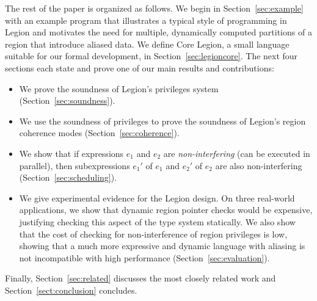 The rest of the paper is organized as follows.
We begin in Section~\ref{sec:example} with an example program that illustrates
a typical style of programming in Legion and motivates the need for multiple, dynamically computed partitions of
a region that introduce aliased data.  We define Core Legion, a small language suitable 
for our formal development, in Section~\ref{sec:legioncore}.
The next four sections each state and prove one of our main results and contributions:
\begin{itemize}
\item We prove the soundness of Legion's privileges system (Section~\ref{sec:soundness}).

\item We use the soundness of privileges to prove the soundness of Legion's region coherence modes (Section~\ref{sec:coherence}).

\item We show that if expressions $e_1$ and $e_2$ are {\em non-interfering} (can be executed in parallel), then subexpressions
$e_1'$ of $e_1$ and $e_2'$ of $e_2$ are also non-interfering (Section~\ref{sec:scheduling}).  

\item We give experimental evidence for the Legion design.  On three real-world applications, we show that 
dynamic region pointer checks would be expensive, justifying checking this aspect of the type system statically.
We also show that the cost of checking for non-interference of region privileges is low, showing that a much more expressive
and dynamic language with aliasing is not incompatible with high performance (Section~\ref{sec:evaluation}).

\end{itemize}
Finally, Section~\ref{sec:related} discusses the most closely related work and
Section~\ref{sect:conclusion} concludes.


  










